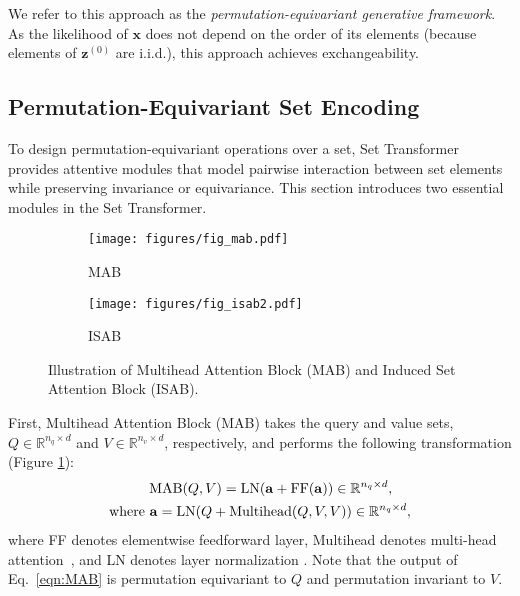 \documentclass[final]{arxiv/cvpr}
\begin{document}
We refer to this approach as the \textit{permutation-equivariant generative framework}.
As the likelihood of $\mathbf{x}$ does not depend on the order of its elements (because elements of $\mathbf{z}^{(0)}$ are i.i.d.), this approach achieves exchangeability.

\subsection{Permutation-Equivariant Set Encoding}
\label{sec:settransformer}
To design permutation-equivariant operations over a set, Set Transformer~\cite{lee2019set} provides attentive modules that model pairwise interaction between set elements while preserving invariance or equivariance.
This section introduces two essential modules in the Set Transformer. 
\begin{figure}[t!]
    \centering
    \begin{subfigure}[b]{0.23\textwidth}
        \centering
        \texttt{[image: figures/fig\_mab.pdf]}
\caption{MAB}
        \label{fig:mab}
    \end{subfigure}
    \hfill
    \begin{subfigure}[b]{0.23\textwidth}
        \centering
        \texttt{[image: figures/fig\_isab2.pdf]}
        \caption{ISAB}
\label{fig:isab}
    \end{subfigure}
    \vspace{-0.1in}
    \caption{Illustration of Multihead Attention Block (MAB) and Induced Set Attention Block (ISAB).}
\label{fig:st}
\vspace{-0.55cm}
\end{figure}

First, Multihead Attention Block (MAB) takes the query and value sets, $Q\in \mathbb{R}^{n_q\times d}$ and  $V\in \mathbb{R}^{n_v\times d}$, respectively, and performs the following transformation (Figure \ref{fig:mab}):
\begin{align}
    \textnormal{MAB}(Q, V) = \textnormal{LN}(\mathbf{a} + \textnormal{FF}(\mathbf{a})) \in \mathbb{R}^{n_q\times d},~~~~ \label{eqn:MAB}\\
    \textnormal{where }
    \mathbf{a} = \textnormal{LN}(Q + \textnormal{Multihead}(Q, V, V)) \in \mathbb{R}^{n_q\times d},\label{eqn:MAB_att}
\end{align}
where FF denotes elementwise feedforward layer, Multihead denotes multi-head attention~\cite{vaswani2017attention}, and LN denotes layer normalization \cite{lee2019set}.
Note that the output of Eq.~\eqref{eqn:MAB} is permutation equivariant to $Q$ and permutation invariant to $V$.
\end{document}
